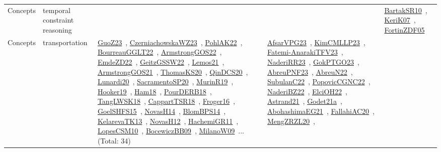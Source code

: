 {\begin{longtable}{lp{3cm}>{\raggedright\arraybackslash}p{6cm}>{\raggedright\arraybackslash}p{6cm}>{\raggedright\arraybackslash}p{8cm}}
Concepts & temporal constraint reasoning &  &  & \href{../works/BartakSR10.pdf}{BartakSR10}~\cite{BartakSR10}, \href{../works/KeriK07.pdf}{KeriK07}~\cite{KeriK07}, \href{../works/FortinZDF05.pdf}{FortinZDF05}~\cite{FortinZDF05}\\
Concepts & transportation & \href{../works/GuoZ23.pdf}{GuoZ23}~\cite{GuoZ23}, \href{../works/CzerniachowskaWZ23.pdf}{CzerniachowskaWZ23}~\cite{CzerniachowskaWZ23}, \href{../works/PohlAK22.pdf}{PohlAK22}~\cite{PohlAK22}, \href{../works/BourreauGGLT22.pdf}{BourreauGGLT22}~\cite{BourreauGGLT22}, \href{../works/ArmstrongGOS22.pdf}{ArmstrongGOS22}~\cite{ArmstrongGOS22}, \href{../works/EmdeZD22.pdf}{EmdeZD22}~\cite{EmdeZD22}, \href{../works/GeitzGSSW22.pdf}{GeitzGSSW22}~\cite{GeitzGSSW22}, \href{../works/Lemos21.pdf}{Lemos21}~\cite{Lemos21}, \href{../works/ArmstrongGOS21.pdf}{ArmstrongGOS21}~\cite{ArmstrongGOS21}, \href{../works/ThomasKS20.pdf}{ThomasKS20}~\cite{ThomasKS20}, \href{../works/QinDCS20.pdf}{QinDCS20}~\cite{QinDCS20}, \href{../works/Lunardi20.pdf}{Lunardi20}~\cite{Lunardi20}, \href{../works/SacramentoSP20.pdf}{SacramentoSP20}~\cite{SacramentoSP20}, \href{../works/MurinR19.pdf}{MurinR19}~\cite{MurinR19}, \href{../works/Hooker19.pdf}{Hooker19}~\cite{Hooker19}, \href{../works/Ham18.pdf}{Ham18}~\cite{Ham18}, \href{../works/PourDERB18.pdf}{PourDERB18}~\cite{PourDERB18}, \href{../works/TangLWSK18.pdf}{TangLWSK18}~\cite{TangLWSK18}, \href{../works/CappartTSR18.pdf}{CappartTSR18}~\cite{CappartTSR18}, \href{../works/Froger16.pdf}{Froger16}~\cite{Froger16}, \href{../works/GoelSHFS15.pdf}{GoelSHFS15}~\cite{GoelSHFS15}, \href{../works/NovasH14.pdf}{NovasH14}~\cite{NovasH14}, \href{../works/BlomBPS14.pdf}{BlomBPS14}~\cite{BlomBPS14}, \href{../works/KelarevaTK13.pdf}{KelarevaTK13}~\cite{KelarevaTK13}, \href{../works/NovasH12.pdf}{NovasH12}~\cite{NovasH12}, \href{../works/HachemiGR11.pdf}{HachemiGR11}~\cite{HachemiGR11}, \href{../works/LopesCSM10.pdf}{LopesCSM10}~\cite{LopesCSM10}, \href{../works/BocewiczBB09.pdf}{BocewiczBB09}~\cite{BocewiczBB09}, \href{../works/MilanoW09.pdf}{MilanoW09}~\cite{MilanoW09}... (Total: 34) & \href{../works/AfsarVPG23.pdf}{AfsarVPG23}~\cite{AfsarVPG23}, \href{../works/KimCMLLP23.pdf}{KimCMLLP23}~\cite{KimCMLLP23}, \href{../works/Fatemi-AnarakiTFV23.pdf}{Fatemi-AnarakiTFV23}~\cite{Fatemi-AnarakiTFV23}, \href{../works/NaderiRR23.pdf}{NaderiRR23}~\cite{NaderiRR23}, \href{../works/GokPTGO23.pdf}{GokPTGO23}~\cite{GokPTGO23}, \href{../works/AbreuPNF23.pdf}{AbreuPNF23}~\cite{AbreuPNF23}, \href{../works/AbreuN22.pdf}{AbreuN22}~\cite{AbreuN22}, \href{../works/SubulanC22.pdf}{SubulanC22}~\cite{SubulanC22}, \href{../works/PopovicCGNC22.pdf}{PopovicCGNC22}~\cite{PopovicCGNC22}, \href{../works/NaderiBZ22.pdf}{NaderiBZ22}~\cite{NaderiBZ22}, \href{../works/ElciOH22.pdf}{ElciOH22}~\cite{ElciOH22}, \href{../works/Astrand21.pdf}{Astrand21}~\cite{Astrand21}, \href{../works/Godet21a.pdf}{Godet21a}~\cite{Godet21a}, \href{../works/AbohashimaEG21.pdf}{AbohashimaEG21}~\cite{AbohashimaEG21}, \href{../works/FallahiAC20.pdf}{FallahiAC20}~\cite{FallahiAC20}, \href{../works/MengZRZL20.pdf}{MengZRZL20}~\cite{MengZRZL20}, 
\end{longtable}}
